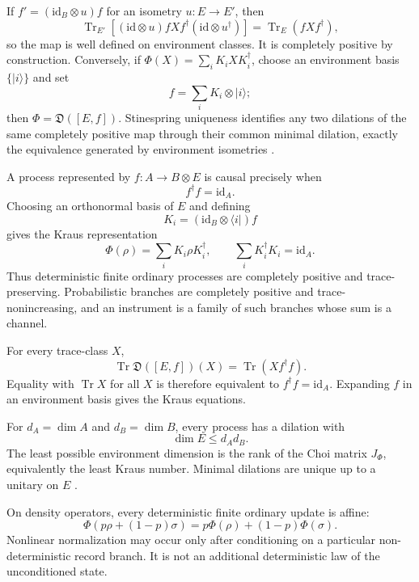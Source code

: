 \begin{proofsketch}
If \(f'=(\mathrm{id}_B\otimes u)f\) for an isometry \(u:E\to E'\), then
\[
 \operatorname{Tr}_{E'}
 \left[(\mathrm{id}\otimes u)fXf^\dagger
       (\mathrm{id}\otimes u^\dagger)\right]
 =\operatorname{Tr}_E(fXf^\dagger),
\]
so the map is well defined on environment classes.  It is completely positive by
construction.  Conversely, if
\(\Phi(X)=\sum_iK_iXK_i^\dagger\), choose an environment basis \(\{|i\rangle\}\)
and set
\[
 f=\sum_i K_i\otimes|i\rangle;
\]
then \(\Phi=\mathfrak D([E,f])\).  Stinespring uniqueness identifies any two
dilations of the same completely positive map through their common minimal
dilation, exactly the equivalence generated by environment isometries
\cite{stinespring,selinger-cpm}.
\end{proofsketch}

\begin{corollary}
\label{cor:cptp-processes}
A process represented by \(f:A\to B\otimes E\) is causal precisely when
\[
 f^\dagger f=\mathrm{id}_A.
\]
Choosing an orthonormal basis of \(E\) and defining
\[
 K_i=(\mathrm{id}_B\otimes\langle i|)f
\]
gives the Kraus representation
\[
 \boxed{
 \Phi(\rho)=\sum_iK_i\rho K_i^\dagger,
 \qquad
 \sum_iK_i^\dagger K_i=\mathrm{id}_A.}
\]
Thus deterministic finite ordinary processes are completely positive and
trace-preserving.  Probabilistic branches are completely positive and
trace-nonincreasing, and an instrument is a family of such branches whose sum is a
channel.
\end{corollary}

\begin{proofsketch}
For every trace-class \(X\),
\[
 \operatorname{Tr}\mathfrak D([E,f])(X)
 =\operatorname{Tr}(Xf^\dagger f).
\]
Equality with \(\operatorname{Tr}X\) for all \(X\) is therefore equivalent to
\(f^\dagger f=\mathrm{id}_A\).  Expanding \(f\) in an environment basis gives the
Kraus equations.
\end{proofsketch}

\begin{corollary}
For \(d_A=\dim A\) and \(d_B=\dim B\), every process has a dilation with
\[
 \dim E\le d_Ad_B.
\]
The least possible environment dimension is the rank of the Choi matrix
\(J_\Phi\), equivalently the least Kraus number.  Minimal dilations are unique up to
a unitary on \(E\) \cite{stinespring,choi-cp}.
\end{corollary}

\begin{corollary}
On density operators, every deterministic finite ordinary update is affine:
\[
 \Phi(p\rho+(1-p)\sigma)
 =p\Phi(\rho)+(1-p)\Phi(\sigma).
\]
Nonlinear normalization may occur only after conditioning on a particular
non-deterministic record branch.  It is not an additional deterministic law of the
unconditioned state.
\end{corollary}

